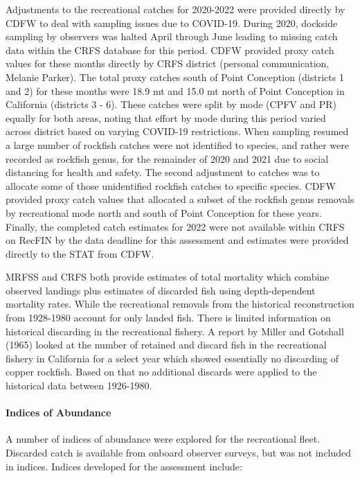 \documentclass[11pt,
  english,
  letterpaper,
]{article}
\begin{document}
Adjustments to the recreational catches for 2020-2022 were provided directly by CDFW to deal with sampling issues due to COVID-19. During 2020, dockside sampling by observers was halted April through June leading to missing catch data within the CRFS database for this period. CDFW provided proxy catch values for these months directly by CRFS district (personal communication, Melanie Parker). The total proxy catches south of Point Conception (districts 1 and 2) for these months were 18.9 mt and 15.0 mt north of Point Conception in California (districts 3 - 6). These catches were split by mode (CPFV and PR) equally for both areas, noting that effort by mode during this period varied across district based on varying COVID-19 restrictions. When sampling resumed a large number of rockfish catches were not identified to species, and rather were recorded as rockfish genus, for the remainder of 2020 and 2021 due to social distancing for health and safety. The second adjustment to catches was to allocate some of those unidentified rockfish catches to specific species. CDFW provided proxy catch values that allocated a subset of the rockfish genus removals by recreational mode north and south of Point Conception for these years. Finally, the completed catch estimates for 2022 were not available within CRFS on RecFIN by the data deadline for this assessment and estimates were provided directly to the STAT from CDFW.

MRFSS and CRFS both provide estimates of total mortality which combine observed landings plus estimates of discarded fish using depth-dependent mortality rates. While the recreational removals from the historical reconstruction from 1928-1980 account for only landed fish. There is limited information on historical discarding in the recreational fishery. A report by Miller and Gotshall (1965) looked at the number of retained and discard fish in the recreational fishery in California for a select year which showed essentially no discarding of copper rockfish. Based on that no additional discards were applied to the historical data between 1926-1980.

\hypertarget{indices-of-abundance}{%
\paragraph{Indices of Abundance}\label{indices-of-abundance}}

\hfill\break

A number of indices of abundance were explored for the recreational fleet. Discarded catch is available from onboard observer surveys, but was not included in indices. Indices developed for the assessment include:
\end{document}
